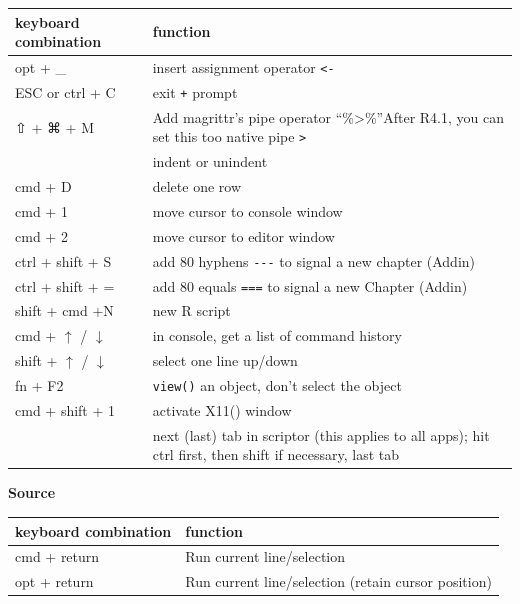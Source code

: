 \documentclass[
]{book}
\theoremstyle{definition}
\theoremstyle{definition}
\theoremstyle{definition}
\theoremstyle{definition}
\theoremstyle{remark}
\begin{document}
\begin{longtable}[]{@{}
  >{\raggedright\arraybackslash}p{}
  >{\raggedright\arraybackslash}p{}@{}}
\toprule\noalign{}
\begin{minipage}[b]{\linewidth}\raggedright
keyboard combination
\end{minipage} & \begin{minipage}[b]{\linewidth}\raggedright
function
\end{minipage} \\
\midrule\noalign{}
\endhead
\bottomrule\noalign{}
\endlastfoot
opt + \_ & insert assignment operator \texttt{\textless{}-} \\
ESC or ctrl + C & exit \texttt{+} prompt \\
⇧ + ⌘ + M & Add magrittr's pipe operator ``\%\textgreater\%''After R4.1, you can set this too native pipe \texttt{\textbar{}\textgreater{}} \\
{ctrl + \texttt{{[}}/\texttt{{]}}} & indent or unindent \\
cmd + D & delete one row \\
cmd + 1 & move cursor to console window \\
cmd + 2 & move cursor to editor window \\
ctrl + shift + S & add 80 hyphens \texttt{-\/-\/-} to signal a new chapter (Addin) \\
ctrl + shift + = & add 80 equals \texttt{===} to signal a new Chapter (Addin) \\
shift + cmd +N & new R script \\
cmd + \(\uparrow\) / \(\downarrow\) & in console, get a list of command history \\
shift + \(\uparrow\) / \(\downarrow\) & select one line up/down \\
fn + F2 & \texttt{view()} an object, don't select the object \\
cmd + shift + 1 & activate X11() window \\
{ctrl (+ shift) + tab} & next (last) tab in scriptor (this applies to all apps); hit ctrl first, then shift if necessary, last tab \\
\end{longtable}

{\textbf{Source}}

\begin{longtable}[]{@{}
  >{\raggedright\arraybackslash}p{}
  >{\raggedright\arraybackslash}p{}@{}}
\toprule\noalign{}
\begin{minipage}[b]{\linewidth}\raggedright
keyboard combination
\end{minipage} & \begin{minipage}[b]{\linewidth}\raggedright
function
\end{minipage} \\
\midrule\noalign{}
\endhead
\bottomrule\noalign{}
\endlastfoot
cmd + return & Run current line/selection \\
opt + return & Run current line/selection (retain cursor position) \\
\end{longtable}
\end{document}
